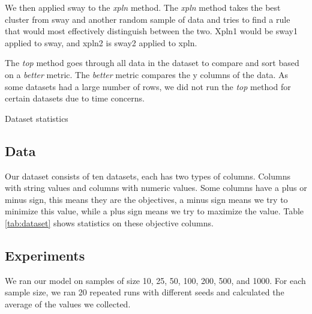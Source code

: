 We then applied sway to the \textit{xpln} method. The \textit{xpln}
method takes the best cluster from sway and another random sample of
data and tries to find a rule that would most effectively distinguish
between the two. Xpln1 would be sway1 applied to sway, and xpln2 is
sway2 applied to xpln.  

The \textit{top} method goes through all data in the dataset to compare
and sort based on a \textit{better} metric. The \textit{better} metric
compares the y columns of the data. As some datasets had a large number
of rows, we did not run the \textit{top} method for certain datasets due
to time concerns.


\begin{table*}[h]
  \begin{center}
    
  \end{center}
  \caption{Dataset statistics}
  \label{tab:dataset}
\end{table*}

\subsection{Data}
  Our dataset consists of ten datasets, each has two types of columns.
  Columns with string values and columns with numeric values. Some
  columns have a plus or minus sign, this means they are the objectives,
  a minus sign means we try to minimize this value, while a plus sign
  means we try to maximize the value. Table \ref{tab:dataset} shows
  statistics on these objective columns.

\subsection{Experiments}
  We ran our model on samples of size 10, 25, 50, 100, 200, 500, and
  1000. For each sample size, we ran 20 repeated runs with different
  seeds and calculated the average of the values we collected.



  